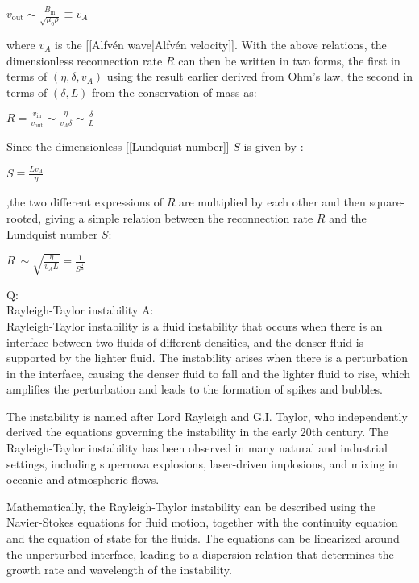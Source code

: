 \documentclass[12pt, a4paper, oneside]{article}
\begin{document}
\begin{spacing}{2.0}
\begin{center}
    $\displaystyle v_\text{out} \sim \frac{B_\text{in}}{\sqrt{\mu_0\rho}} \equiv v_A$
\end{center}
where $v_A$ is the [[Alfvén wave|Alfvén velocity]].  With the above relations, 
the dimensionless reconnection rate $R$ can then be written in two forms, the first in terms of $(\eta, \delta, v_A)$ using 
the result earlier derived from Ohm's law, the second in terms of $(\delta, L)$ from the conservation of mass as: 
\begin{center}
    $\displaystyle R = \frac{v_\text{in}}{v_\text{out}} \sim \frac{\eta}{v_A\delta} \sim \frac{\delta}{L}$
\end{center}
Since the dimensionless [[Lundquist number]] $S$ is given by
: 
\begin{center}
    $\displaystyle S \equiv \frac{Lv_A}{\eta}$
\end{center}
,the two different expressions of $R$ are multiplied by each other and then square-rooted, 
giving a simple relation between the reconnection rate $R$ and the Lundquist number $S$: 
\begin{center}
    $\displaystyle R ~ \sim \sqrt{\frac{\eta}{v_A L}} = \frac{1}{S^\frac{1}{2}}$
\end{center}

Q:\\
Rayleigh-Taylor instability
A:\\
Rayleigh-Taylor instability is a fluid instability that occurs when there is an interface between two fluids of different densities, 
and the denser fluid is supported by the lighter fluid. The instability arises when there is a perturbation in the interface, 
causing the denser fluid to fall and the lighter fluid to rise, which amplifies the perturbation and leads to the formation of spikes 
and bubbles.

The instability is named after Lord Rayleigh and G.I. Taylor, who independently derived the equations governing the instability 
in the early 20th century. The Rayleigh-Taylor instability has been observed in many natural and industrial settings, including 
supernova explosions, laser-driven implosions, and mixing in oceanic and atmospheric flows.

Mathematically, the Rayleigh-Taylor instability can be described using the Navier-Stokes equations for fluid motion, 
together with the continuity equation and the equation of state for the fluids. The equations can be linearized around the 
unperturbed interface, leading to a dispersion relation that determines the growth rate and wavelength of the instability.


\end{spacing}
\end{document}
